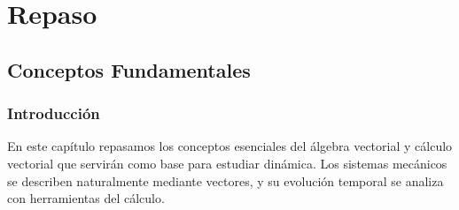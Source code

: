 
\setcounter{chapter}{-1}
\chapter{Repaso}

\section{Conceptos Fundamentales}

\subsection*{Introducción}

En este capítulo repasamos los conceptos esenciales del álgebra vectorial y cálculo vectorial que servirán como base para estudiar dinámica. Los sistemas mecánicos se describen naturalmente mediante vectores, y su evolución temporal se analiza con herramientas del cálculo.

